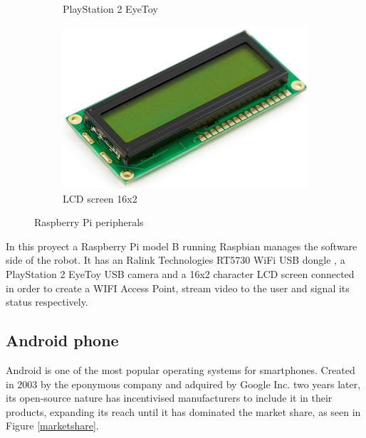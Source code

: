 \begin{figure}[H]
\begin{subfigure}[b]{0.3\textwidth}
				\caption{PlayStation 2 EyeToy }
		        \label{}
		    \end{subfigure}
		    \hfill
		    \begin{subfigure}[b]{0.3\textwidth}
		        \centering
		      	\includegraphics[scale=0.25]{images/ProjectComponents/lcd.jpg}
				\caption{LCD screen 16x2}
		        \label{}
		    \end{subfigure}
		    \caption{Raspberry Pi peripherals}
		    \label{}
		\end{figure}


	In this proyect a Raspberry Pi model B running Raspbian manages the software side of the robot. It has an Ralink Technologies RT5730 WiFi USB dongle , a PlayStation 2 EyeToy USB camera and a 16x2 character LCD screen connected in order to create a WIFI Access Point, stream video to the user and signal its status respectively.






\newpage
\subsection{Android phone}

Android is one of the most popular operating systems for smartphones. Created in 2003 by the eponymous company and adquired by Google Inc. two years later, its open-source nature has incentivised manufacturers to include it in their products, expanding its reach until it has dominated the market share, as seen in Figure \ref{marketshare}.

